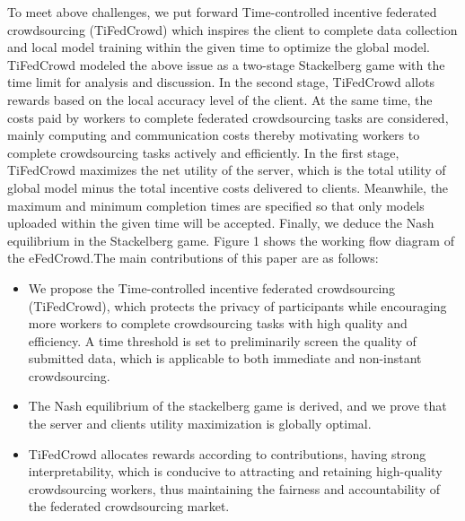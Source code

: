 \documentclass[final,1p,times]{elsarticle}
\begin{document}
To meet above challenges, we put forward Time-controlled incentive federated crowdsourcing (TiFedCrowd) which inspires the client to complete data collection and local model training within the given time to optimize the global model. TiFedCrowd modeled the above issue as a two-stage Stackelberg game \citep{li2017review} with the time limit for analysis and discussion. In the second stage, TiFedCrowd allots rewards based on the local accuracy level of the client. At the same time, the costs paid by workers to complete federated crowdsourcing tasks are considered, mainly computing and communication costs thereby motivating workers to complete crowdsourcing tasks actively and efficiently. In the first stage, TiFedCrowd maximizes the net utility of the server, which is the total utility of global model minus the total incentive costs delivered to clients. Meanwhile, the maximum and minimum completion times are specified so that only models uploaded within the given time will be accepted. Finally, we deduce the Nash equilibrium in the Stackelberg game. Figure 1 shows the working flow diagram of the eFedCrowd.The main contributions of this paper are as follows:
\begin{itemize}
	\item We propose the Time-controlled incentive federated crowdsourcing (TiFedCrowd), which protects the privacy of participants while encouraging more workers to complete crowdsourcing tasks with high quality and efficiency. A time threshold is set to preliminarily screen the quality of submitted data, which is applicable to both immediate and non-instant crowdsourcing.
	\item The Nash equilibrium of the stackelberg game is derived, and we prove that the server and clients utility maximization is globally optimal.
	\item TiFedCrowd allocates rewards according to contributions, having strong interpretability, which is conducive to attracting and retaining high-quality crowdsourcing workers, thus maintaining the fairness and accountability of the federated crowdsourcing market.
\end{itemize}
\end{document}
